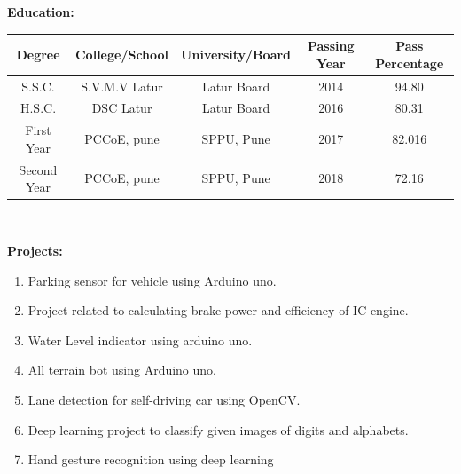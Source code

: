 \documentclass[10pt,twoside,a4paper]{article}
\begin{document}
\noindent
\textbf{Education:}
\begin{center}
\begin{tabular}{|c|c|c|c|c|}
\hline
Degree & College/School & University/Board & Passing Year & Pass Percentage \\
\hline
S.S.C. & S.V.M.V Latur & Latur Board & 2014 & 94.80 \\
\hline
H.S.C. & DSC Latur & Latur Board & 2016 & 80.31 \\
\hline
First Year & PCCoE, pune & SPPU, Pune & 2017 & 82.016 \\
\hline
Second Year & PCCoE, pune & SPPU, Pune & 2018 & 72.16 \\
\hline
\end{tabular}
\\
\end{center}


\noindent
\textbf{Projects:} 
\begin{enumerate}
\item Parking sensor for vehicle using Arduino uno.
\item Project related to calculating brake power and efficiency of IC engine.
\item Water Level indicator using arduino uno.
\item All terrain bot using Arduino uno.
\item Lane detection for self-driving car using OpenCV.
\item  Deep learning project to classify given images of digits and alphabets.
\item Hand gesture recognition using deep learning
\\
\end{enumerate}
\end{document}
